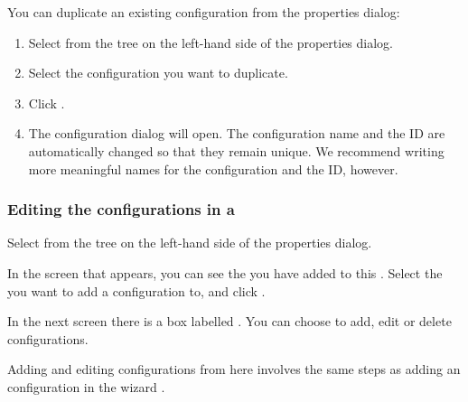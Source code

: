 You can duplicate an existing \gdaut{} configuration from the \gdproject{} properties dialog:
\begin{enumerate}
\item Select  from the tree on the left-hand side of the \gdproject{} properties dialog.
\item Select the \gdaut{} configuration you want to duplicate.
\item Click .
\item The \gdaut{} configuration dialog will open. The \gdaut{} configuration name and the \gdaut{} ID are automatically changed so that they remain unique. We recommend writing more meaningful names for the configuration and the ID, however. 
\end{enumerate}


\subsubsection{Editing the \gdaut{} configurations in a \gdproject{}}
\label{ProjPropertiesEditAUTConfig}
Select  from the tree on the left-hand side of the \gdproject{} properties dialog. 

In the screen that appears, you can see the \gdauts{} you have added to this \gdproject{}. Select the \gdaut{} you want to add a configuration to, and click . 

In the next screen there is a box labelled . You can choose to add, edit or delete \gdaut{} configurations. 

Adding and editing \gdaut{} configurations from here involves the same steps as adding an \gdaut{} configuration in the \gdproject{} wizard . 


